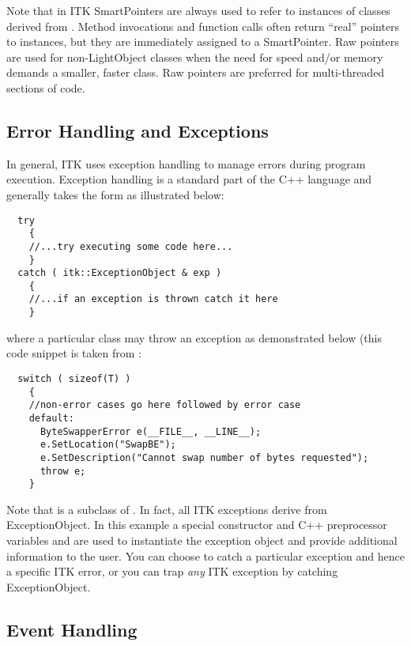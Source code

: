 Note that in ITK SmartPointers are always used to refer to instances of
classes derived from . Method invocations and function
calls often return ``real'' pointers to instances, but they are immediately
assigned to a SmartPointer. Raw pointers are used for non-LightObject classes when
the need for speed and/or memory demands a smaller, faster class. Raw pointers
are preferred for multi-threaded sections of code.


\subsection{Error Handling and Exceptions}
\label{sec:ErrorHandling}


In general, ITK uses exception handling to manage errors during program
execution. Exception handling is a standard part of the C++ language and
generally takes the form as illustrated below:

\small
\begin{verbatim}
  try
    {
    //...try executing some code here...
    }
  catch ( itk::ExceptionObject & exp )
    {
    //...if an exception is thrown catch it here
    }
\end{verbatim}
\normalsize

where a particular class may throw an exception as demonstrated below (this
code snippet is taken from :
\small
\begin{verbatim}
  switch ( sizeof(T) )
    {
    //non-error cases go here followed by error case
    default:
      ByteSwapperError e(__FILE__, __LINE__);
      e.SetLocation("SwapBE");
      e.SetDescription("Cannot swap number of bytes requested");
      throw e;
    }
\end{verbatim}
\normalsize

Note that  is a subclass of
. In fact, all ITK exceptions derive
from ExceptionObject. In this example a special constructor and C++
preprocessor variables  and  are used to instantiate
the exception object and provide additional information to the user. You can
choose to catch a particular exception and hence a specific ITK error, or you
can trap \emph{any} ITK exception by catching ExceptionObject.


\subsection{Event Handling}
\label{sec:EventHandling}

